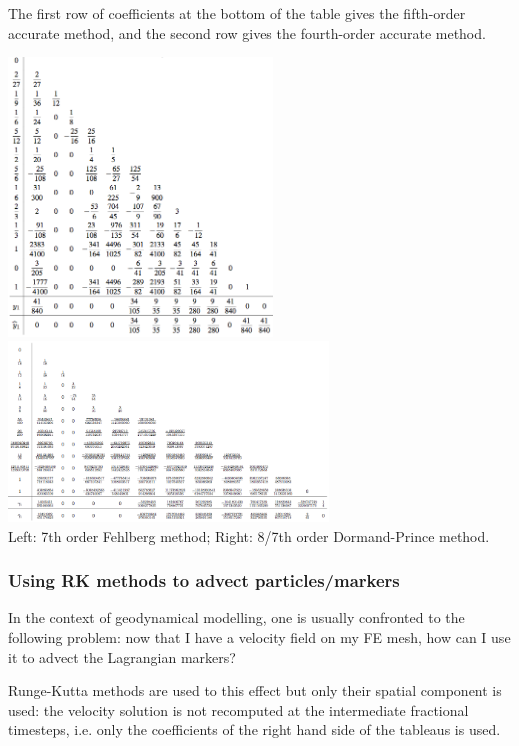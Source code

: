 The first row of coefficients at the bottom of the table gives the fifth-order accurate method, and the second row gives the fourth-order accurate method. 

\begin{center}
\includegraphics[width=7cm]{images/rungekutta/fe7}
\includegraphics[width=8.5cm]{images/rungekutta/dp87}\\
{\captionfont Left: 7th order Fehlberg method; Right: 8/7th order Dormand-Prince method.}
\end{center}

\Literature \cite{fehl85,hanw93,dopr80,dopr86,prdo81,caka90,butcher03}


\subsubsection{Using RK methods to advect particles/markers \label{sec:rkparticles}}

In the context of geodynamical modelling, one is usually confronted to the following problem:
now that I have a velocity field on my FE mesh, how can I use it to advect the Lagrangian 
markers?

Runge-Kutta methods are used to this effect but only their spatial component is used:
the velocity solution is not recomputed at the intermediate fractional timesteps, i.e. 
only the coefficients of the right hand side of the tableaus is used.

